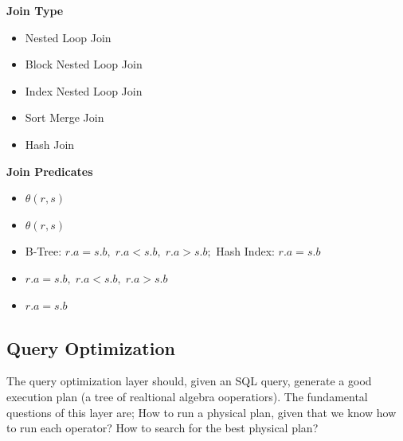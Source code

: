 \begin{tcolorbox}
\begin{minipage}[t]{.4\textwidth}
\textbf{Join Type}
\begin{itemize}
\item Nested Loop Join
\item Block Nested Loop Join
\item Index Nested Loop Join
\item Sort Merge Join
\item Hash Join
\end{itemize}
\end{minipage}
\begin{minipage}[t]{.6\textwidth}
\textbf{Join Predicates}
\begin{itemize}
\item $\theta(r, s)$
\item $\theta(r, s)$
\item B-Tree: $r.a = s.b,\; r.a < s.b,\; r.a > s.b;$ Hash Index: $r.a = s.b$
\item $r.a = s.b,\; r.a < s.b,\;r.a > s.b$
\item $r.a = s.b$
\end{itemize}
\end{minipage}
\end{tcolorbox}

\subsection{Query Optimization}
The query optimization layer should, given an SQL query, generate a good execution plan (a tree of realtional algebra ooperatiors). The fundamental questions of this layer are; How to run a physical plan, given that we know how to run each operator? How to search for the best physical plan?


